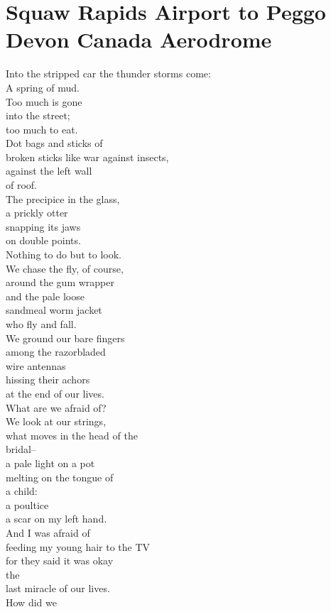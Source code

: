 \documentclass[smalldemyvopaper,11pt,twoside,onecolumn,openright,extrafontsizes]{memoir}
\begin{document}
\chapter{Squaw Rapids Airport to Peggo Devon Canada Aerodrome}
Into the stripped car the thunder storms come:
\\A spring of mud.
\\Too much is gone
\\into the street;
\\too much to eat.
\\Dot bags and sticks of
\\broken sticks like war against insects,
\\against the left wall
\\of roof.
\\The precipice in the glass,
\\a prickly otter
\\snapping its jaws
\\on double points.
\\Nothing to do but to look.
\\We chase the fly, of course,
\\around the gum wrapper
\\and the pale loose
\\sandmeal worm jacket
\\who fly and fall.
\\We ground our bare fingers
\\among the razorbladed
\\wire antennas
\\hissing their achors
\\at the end of our lives.
\\What are we afraid of?
\\We look at our strings,
\\what moves in the head of the
\\bridal--
\\a pale light on a pot
\\melting on the tongue of
\\a child:
\\a poultice
\\a scar on my left hand.
\\And I was afraid of
\\feeding my young hair to the TV
\\for they said it was okay
\\the
\\last miracle of our lives.
\\How did we
\end{document}
